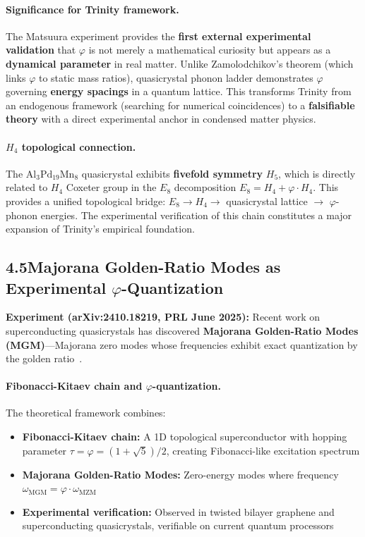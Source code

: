 \documentclass[10pt,a4paper]{article}
\begin{document}
\paragraph{Significance for Trinity framework.} The Matsuura experiment
provides the \textbf{first external experimental validation} that $\varphi$ is not merely
a mathematical curiosity but appears as a \textbf{dynamical parameter} in real matter.
Unlike Zamolodchikov's theorem (which links $\varphi$ to static mass ratios),
quasicrystal phonon ladder demonstrates $\varphi$ governing \textbf{energy spacings}
in a quantum lattice. This transforms Trinity from an endogenous framework (searching
for numerical coincidences) to a \textbf{falsifiable theory} with a direct
experimental anchor in condensed matter physics.

\paragraph{$H_4$ topological connection.} The $\text{Al}_3\text{Pd}_{19}\text{Mn}_8$
quasicrystal exhibits \textbf{fivefold symmetry} $H_5$, which is directly
related to $H_4$ Coxeter group in the $E_8$ decomposition
$E_8 = H_4 + \varphi \cdot H_4$. This provides a unified
topological bridge: $E_8 \rightarrow H_4 \rightarrow$ quasicrystal lattice
$\rightarrow$ $\varphi$-phonon energies. The experimental verification of this chain
constitutes a major expansion of Trinity's empirical foundation.

\subsection*{4.5\quad Majorana Golden-Ratio Modes as Experimental $\varphi$-Quantization}

\textbf{Experiment (arXiv:2410.18219, PRL June 2025):} Recent work on superconducting quasicrystals has discovered \textbf{Majorana Golden-Ratio Modes (MGM)}---Majorana zero modes whose frequencies exhibit exact quantization by the golden ratio~\cite{MGMPRL2025}.

\paragraph{Fibonacci-Kitaev chain and $\varphi$-quantization.} The theoretical framework combines:
\begin{itemize}
  \item \textbf{Fibonacci-Kitaev chain:} A 1D topological superconductor with hopping parameter $\tau = \varphi = (1+\sqrt{5})/2$, creating Fibonacci-like excitation spectrum
  \item \textbf{Majorana Golden-Ratio Modes:} Zero-energy modes where frequency $\omega_{\text{MGM}} = \varphi \cdot \omega_{\text{MZM}}$
  \item \textbf{Experimental verification:} Observed in twisted bilayer graphene and superconducting quasicrystals, verifiable on current quantum processors
\end{itemize}
\end{document}
